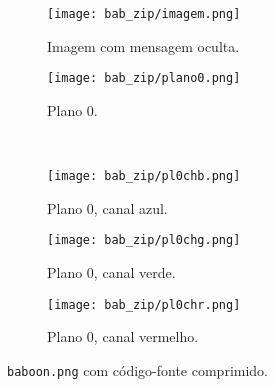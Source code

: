 \begin{figure}[H]
    \centering
    \begin{subfigure}{0.4\textwidth}
        \centering
        \texttt{[image: bab\_zip/imagem.png]}
        \caption{Imagem com mensagem oculta.}
        \label{fig:binzip:imagem}
    \end{subfigure}%
    \begin{subfigure}{0.4\textwidth}
        \centering
        \texttt{[image: bab\_zip/plano0.png]}
        \caption{Plano 0.}
        \label{fig:binzip:plano}
    \end{subfigure}\\[8pt]
    \begin{subfigure}{0.28\textwidth}
        \centering
        \texttt{[image: bab\_zip/pl0chb.png]}
        \caption{Plano 0, canal azul.}
        \label{fig:binzip:blue}
    \end{subfigure}%
    \begin{subfigure}{0.28\textwidth}
        \centering
        \texttt{[image: bab\_zip/pl0chg.png]}
        \caption{Plano 0, canal verde.}
        \label{fig:binzip:green}
    \end{subfigure}%
    \begin{subfigure}{0.28\textwidth}
        \centering
        \texttt{[image: bab\_zip/pl0chr.png]}
        \caption{Plano 0, canal vermelho.}
        \label{fig:binzip:red}
    \end{subfigure}%

    \caption{\texttt{baboon.png} com código-fonte comprimido.}
    \label{fig:binzip}
\end{figure}